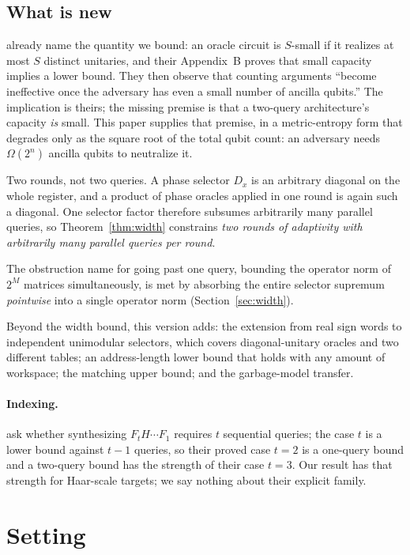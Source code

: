 \documentclass[11pt,a4paper]{article}
\theoremstyle{plain}
\theoremstyle{definition}
\theoremstyle{remark}
\begin{document}
\subsection{What is new}

\cite[Def.~B.1]{LMW24} already name the quantity we bound: an oracle circuit is $S$-small if
it realizes at most $S$ distinct unitaries, and their Appendix~B proves that small capacity
implies a lower bound. They then observe that counting arguments ``become ineffective once
the adversary has even a small number of ancilla qubits.'' The implication is theirs; the
missing premise is that a two-query architecture's capacity \emph{is} small. This paper
supplies that premise, in a metric-entropy form that degrades only as the square root of
the total qubit count: an adversary needs $\Omega(2^n)$ ancilla qubits to neutralize it.

Two rounds, not two queries. A phase selector $D_x$ is an arbitrary diagonal on the whole
register, and a product of phase oracles applied in one round is again such a diagonal. One
selector factor therefore subsumes arbitrarily many parallel queries, so
Theorem~\ref{thm:width} constrains \emph{two rounds of adaptivity with arbitrarily many
parallel queries per round}.

The obstruction \cite[\S2.5]{LMW24} name for going past one query, bounding the operator
norm of $2^M$ matrices simultaneously, is met by absorbing the entire selector supremum
\emph{pointwise} into a single operator norm (Section~\ref{sec:width}).

Beyond the width bound, this version adds: the extension from real sign words to
independent unimodular selectors, which covers diagonal-unitary oracles and two different
tables; an address-length lower bound that holds with any amount of workspace; the matching
upper bound; and the garbage-model transfer.

\paragraph{Indexing.} \cite[Question~1.4]{DLM26} ask whether synthesizing $F_tH\cdots F_1$
requires $t$ sequential queries; the case $t$ is a lower bound against $t-1$ queries, so
their proved case $t=2$ is a one-query bound and a two-query bound has the strength of their
case $t=3$. Our result has that strength for Haar-scale targets; we say nothing about their
explicit family.

\section{Setting}\label{sec:setting}
\end{document}
